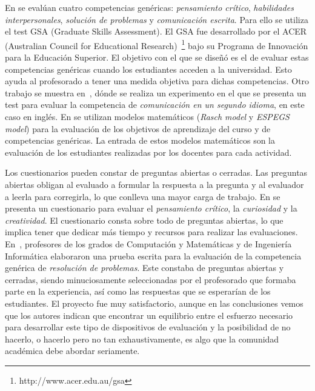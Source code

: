 En \cite{badcock2010developing} se evalúan cuatro competencias genéricas: \emph{pensamiento crítico}, \emph{habilidades interpersonales}, \emph{solución de problemas} y \emph{comunicación escrita}. Para ello se utiliza el test GSA (Graduate Skills Assessment). El GSA fue desarrollado por el ACER (Australian Council for Educational Research)~\footnote{http://www.acer.edu.au/gsa}  bajo su Programa de Innovación para la Educación Superior. El objetivo con el que se diseñó es el de evaluar estas competencias genéricas cuando los estudiantes acceden a la universidad. Esto ayuda al profesorado a tener una medida objetiva para dichas competencias. Otro trabajo se muestra en~\cite{fernandez2011experience}, dónde se realiza un experimento en el que se presenta un test para evaluar la competencia de \emph{comunicación en un segundo idioma}, en este caso en inglés. En \cite{aziz2007appraisal,rashid2008engineering,a2007outcome} se utilizan modelos matemáticos (\emph{Rasch model} y \emph{ESPEGS model}) para la evaluación de los objetivos de aprendizaje del curso y de competencias genéricas. La entrada de estos modelos matemáticos son la evaluación de los estudiantes realizadas por los docentes para cada actividad. 

Los cuestionarios pueden constar de preguntas abiertas o cerradas. Las preguntas abiertas obligan al evaluado a formular la respuesta a la pregunta y al evaluador a leerla para corregirla, lo que conlleva una mayor carga de trabajo. En \cite{albergaria2011critical} se presenta un cuestionario para evaluar el \emph{pensamiento crítico}, la \emph{curiosidad} y la \emph{creatividad}. El cuestionario consta sobre todo de preguntas abiertas, lo que implica tener que dedicar más tiempo y recursos para realizar las evaluaciones. En~\cite{vizcarro2013assessment}, profesores de los grados de Computación y Matemáticas y de Ingeniería Informática elaboraron una prueba escrita para la evaluación de la competencia genérica de \emph{resolución de problemas}. Este constaba de preguntas abiertas y cerradas, siendo minuciosamente seleccionadas por el profesorado que formaba parte en la experiencia, así como las respuestas que se esperarían de los estudiantes. El proyecto fue muy satisfactorio, aunque en las conclusiones vemos que los autores indican que encontrar un equilibrio entre el esfuerzo necesario para desarrollar este tipo de dispositivos de evaluación y la posibilidad de no hacerlo, o hacerlo pero no tan exhaustivamente, es algo que la comunidad académica debe abordar seriamente.



